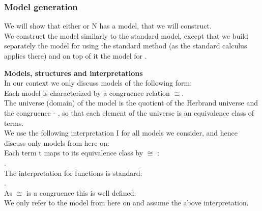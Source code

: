 \subsubsection*{Model generation}
We will show that either  or N has a model, that we will construct.\\
We construct the model similarly to the standard model, except that we build separately the model for  using the standard method (as the standard calculus applies there) and on top of it the model for .

\textbf{Models, structures and interpretations}\\
In our context we only discuss models of the following form:\\
Each model is characterized by a congruence relation $\cong$.\\
The universe (domain) of the model is the quotient of the Herbrand universe and the congruence - \m{\Ts{\Sigma} / \cong}, so that each element of the universe is an equivalence class of terms.\\
We use the following interpretation I for all models we consider, and hence discuss only models from here on:\\
Each term t maps to its equivalence class by $\cong$ :\\
.\\
The interpretation for functions is standard: \\
.\\
As $\cong$ is a congruence this is well defined.\\
We only refer to the model from here on and assume the above interpretation.

